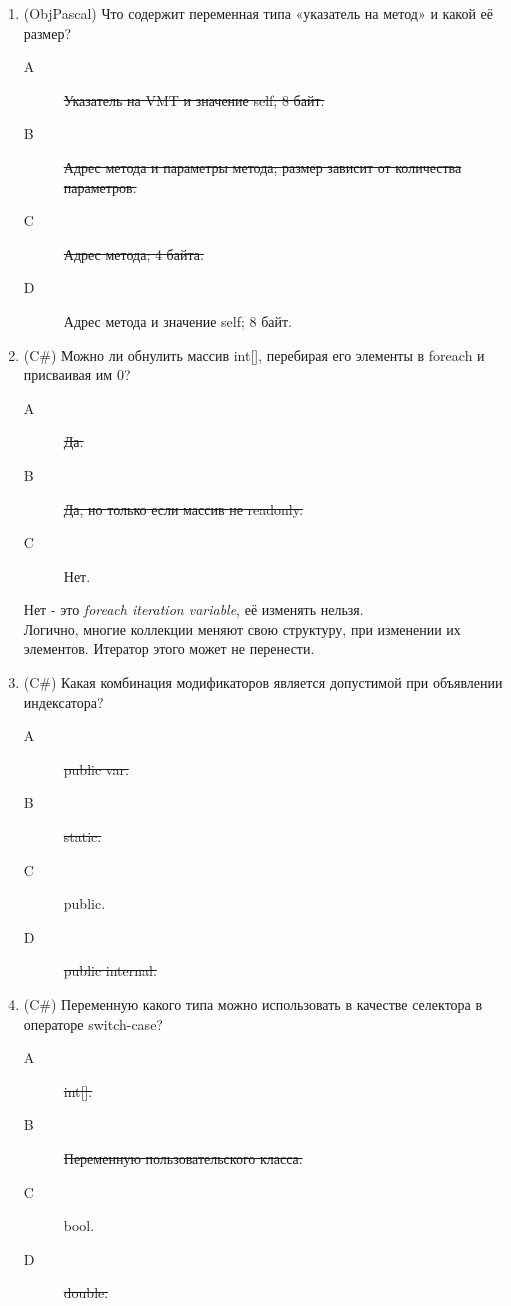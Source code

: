 \documentclass[12pt]{article}
\begin{document}
\begin{enumerate}
		\item (ObjPascal)  Что содержит переменная типа «указатель на метод» и какой её размер?
			\begin{description}
				\item[A] \sout{Указатель на VMT и значение self; 8 байт.}
				\item[B] \sout{Адрес метода и параметры метода; размер зависит от количества параметров.}
				\item[C] \sout{Адрес метода; 4 байта.}
				\item[D] Адрес метода и значение self; 8 байт.
			\end{description}

		\item (C\#) Можно ли обнулить массив int[], перебирая его элементы в foreach и присваивая им 0? 
			\begin{description}
				\item[A] \sout{Да.} 
				\item[B] \sout{Да, но только если массив не readonly.}
				\item[C] Нет.
			\end{description}

			Нет - это \emph{foreach iteration variable}, её изменять нельзя.
			\\
			Логично, многие коллекции меняют свою структуру, при изменении их элементов. Итератор этого может не перенести.

		\item (C\#) Какая комбинация модификаторов является допустимой при объявлении индексатора? 
			\begin{description}
				\item[A] \sout{public var.}
				\item[B] \sout{static.}
				\item[C] public.
				\item[D] \sout{public internal.}
			\end{description}

		\item (C\#) Переменную какого типа можно использовать в качестве селектора в операторе switch-case? 
			\begin{description}
				\item[A] \sout{int[].}
				\item[B] \sout{Переменную пользовательского класса.}
				\item[C] bool.
				\item[D] \sout{double.}
			\end{description}


	\end{enumerate}
\end{document}

